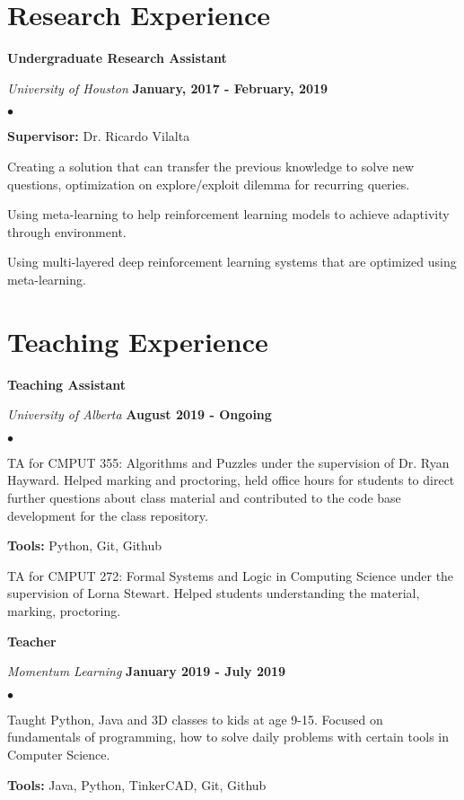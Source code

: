 \documentclass[margin,line]{res}
\newenvironment{list2}{
  \begin{list}{$\bullet$}{%
      \setlength{\itemsep}{0in}
      \setlength{\parsep}{0in} \setlength{\parskip}{0in}
      \setlength{\topsep}{0in} \setlength{\partopsep}{0in} 
      \setlength{\leftmargin}{0.2in}}}{\end{list}}
\begin{document}
\begin{resume}
\section{\sc Research Experience}

{\bf Undergraduate Research Assistant}

\vspace{-.3cm}
{\em University of Houston} \hfill {\bf January, 2017 - February, 2019}\\ 
\vspace{-.3cm}
\begin{list2}
\item \textbf{Supervisor:} Dr. Ricardo Vilalta
\item Creating a solution that can transfer the previous knowledge to solve new questions, optimization on explore/exploit dilemma for recurring queries. 
\item Using meta-learning to help reinforcement learning models to achieve adaptivity through environment. 
\item Using multi-layered deep reinforcement learning systems that are optimized using meta-learning. 
\end{list2}

\section{\sc Teaching Experience}
{\bf Teaching Assistant}

\vspace{-.3cm}
{\em University of Alberta} \hfill {\bf August 2019 - Ongoing}\\
\begin{list2}
	\item TA for CMPUT 355: Algorithms and Puzzles under the supervision of Dr. Ryan Hayward. Helped marking and proctoring, held office hours for students to direct further questions about class material and contributed to the code base development for the class repository.
	
	\textbf{Tools:} Python, Git, Github
	\item TA for CMPUT 272: Formal Systems and Logic in Computing Science under the supervision of Lorna Stewart. Helped students understanding the material, marking, proctoring.
	
\end{list2}
\vspace*{.05in}

{\bf Teacher}

\vspace{-.3cm}
{\em Momentum Learning} \hfill {\bf January 2019 - July 2019}\\
\begin{list2}
\item Taught Python, Java and 3D classes to kids at age 9-15. Focused on fundamentals of programming, how to solve daily problems with certain tools in Computer Science.
\item \textbf{Tools:} Java, Python, TinkerCAD, Git, Github
\end{list2}
\vspace*{.05in}


\end{resume}
\end{document}
